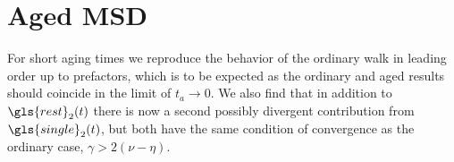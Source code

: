 
\section{Aged MSD}

For short aging times we reproduce the behavior of the ordinary walk in leading order up to prefactors, which is to be expected as the ordinary and aged results should coincide in the limit of $t_a \to 0$. We also find that in addition to $\gls{rest}_2(t)$ there is now a second possibly divergent contribution from $\gls{single}_2(t)$, but both have the same condition of convergence as the ordinary case, $\gamma > 2(\nu-\eta)$. \\


